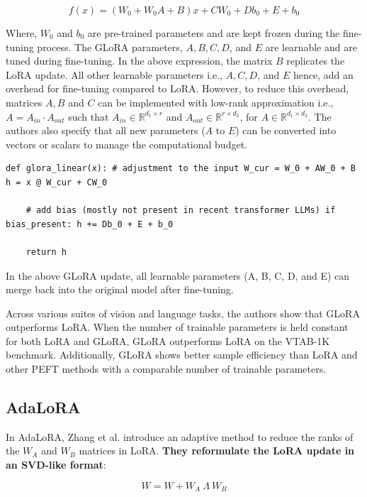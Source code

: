 \begin{equation*}
    f(x) = (W_{0} + W_{0}A + B)x + CW_{0} + Db_{0} + E + b_0 
\end{equation*}

Where, $W_0$ and $b_0$ are pre-trained parameters and are kept frozen during the fine-tuning process. The GLoRA parameters, $A, B, C, D$, and $E$ are learnable and are tuned during fine-tuning. In the above expression, the matrix $B$ replicates the LoRA update. All other learnable parameters i.e., $A, C, D$, and $E$ hence, add an overhead for fine-tuning compared to LoRA. However, to reduce this overhead, matrices $A, B$ and $C$ can be implemented with low-rank approximation i.e., $A = A_{in} \cdot A_{out}$ such that $A_{in} \in \mathbb{R}^{d_1 \times r}$ and $A_{out} \in \mathbb{R}^{r \times d_2}$, for $A \in \mathbb{R}^{d_1 \times d_2}$. The authors also specify that all new parameters ($A$ to $E$) can be converted into vectors or scalars to manage the computational budget.

\begin{lstlisting}
def glora_linear(x): # adjustment to the input W_cur = W_0 + AW_0 + B h = x @ W_cur + CW_0

    # add bias (mostly not present in recent transformer LLMs) if bias_present: h += Db_0 + E + b_0

    return h
\end{lstlisting}

In the above GLoRA update, all learnable parameters (A, B, C, D, and E) can merge back into the original model after fine-tuning. 

Across various suites of vision and language tasks, the authors show that GLoRA outperforms LoRA. When the number of trainable parameters is held constant for both LoRA and GLoRA, GLoRA outperforms LoRA on the VTAB-1K benchmark. Additionally, GLoRA shows better sample efficiency than LoRA and other PEFT methods with a comparable number of trainable parameters.

\subsection{AdaLoRA}

In AdaLoRA, Zhang et al. \citep{zhang2023adaptive} introduce an adaptive method to reduce the ranks of the $W_A$ and $W_B$ matrices in LoRA. \textbf{They reformulate the LoRA update in an SVD-like format}:

\begin{equation*} W = W + W_A\ \Lambda\ W_B \end{equation*}

